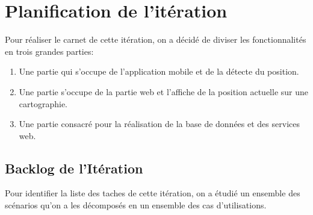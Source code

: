 


\section{Planification de l'itération}

Pour réaliser le carnet de cette itération, on a décidé de diviser les
fonctionnalités en trois grandes parties:

\begin{enumerate}
    \item Une partie qui s'occupe de l'application mobile et de la détecte du
        position.
    \item Une partie  s'occupe de la partie web et l'affiche de la position
        actuelle sur une cartographie.
    \item Une partie consacré pour la réalisation de la base de données et des
        services web.
\end{enumerate}

\subsection{Backlog de l'Itération}

Pour identifier la liste des taches de cette itération, on a étudié un ensemble
des scénarios qu'on a les décomposés en un ensemble des cas d'utilisations.

